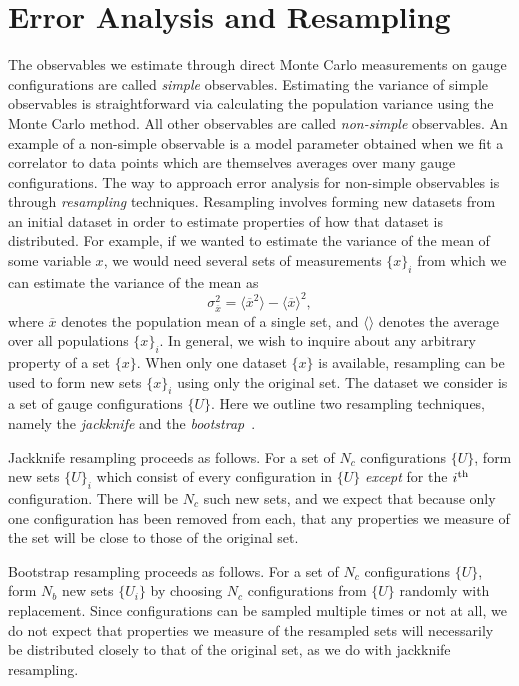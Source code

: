 \section{Error Analysis and Resampling}
The observables we estimate through direct Monte Carlo measurements on gauge configurations are called \emph{simple} observables. Estimating the variance of simple observables is straightforward via calculating the population variance using the Monte Carlo method. All other observables are called \emph{non-simple} observables. An example of a non-simple observable is a model parameter obtained when we fit a correlator to data points which are themselves averages over many gauge configurations. The way to approach error analysis for non-simple observables is through \emph{resampling} techniques. Resampling involves forming new datasets from an initial dataset in order to estimate properties of how that dataset is distributed. For example, if we wanted to estimate the variance of the mean of some variable $x$, we would need several sets of measurements $\{x\}_i$ from which we can estimate the variance of the mean as
\begin{equation}
    \sigma^2_{\overline x} = \langle  \overline x^2 \rangle  - \langle \overline x \rangle ^2,
\end{equation}
where $\overline x$ denotes the population mean of a single set, and $\langle\rangle$ denotes the average over all populations $\{x\}_i$. In general, we wish to inquire about any arbitrary property of a set $\{x\}$. When only one dataset $\{x\}$ is available, resampling can be used to form new sets $\{x\}_i$ using only the original set. The dataset we consider is a set of gauge configurations $\{U\}$. Here we outline two resampling techniques, namely the \emph{jackknife} and the \emph{bootstrap}~\cite{efron1982jackknife}.

Jackknife resampling proceeds as follows. For a set of $N_c$ configurations $\{U\}$, form new sets $\{U\}_i$ which consist of every configuration in $\{U\}$ \emph{except} for the $i^{\rm{th}}$ configuration. There will be $N_c$ such new sets, and we expect that because only one configuration has been removed from each, that any properties we measure of the set will be close to those of the original set.

Bootstrap resampling proceeds as follows. For a set of $N_c$ configurations $\{U\}$, form $N_b$ new sets $\{U_i\}$ by choosing $N_c$ configurations from $\{U\}$ randomly with replacement. Since configurations can be sampled multiple times or not at all, we do not expect that properties we measure of the resampled sets will necessarily be distributed closely to that of the original set, as we do with jackknife resampling.

